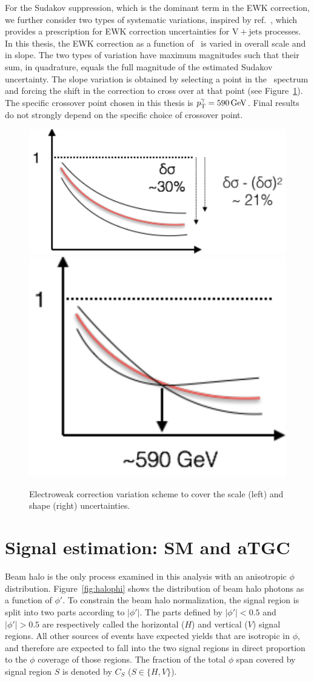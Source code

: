 For the Sudakov suppression, which is the dominant term in the EWK correction, we further
consider two types of systematic variations, inspired by ref.~\cite{ref:epjc/s10052-017-5389-1}, which provides
a prescription for EWK correction uncertainties for $\mathrm{V}+\mathrm{jets}$ processes. In
this thesis, the EWK correction as a function of \pTgamma\ is varied in overall scale and in
slope. The two types of variation have maximum magnitudes such that their sum, in quadrature, equals the full
magnitude of the estimated Sudakov uncertainty. The slope variation is obtained by selecting a point in the \pTgamma\ spectrum and forcing
the shift in the correction to cross over at that point (see Figure~\ref{fig:ewk_correction_cartoon}). The specific crossover
point chosen in this thesis is $\pTgamma = 590\unit{GeV}$. Final results do not strongly depend on the
specific choice of crossover point.

\begin{figure}[htbp]
  \centering
  \includegraphics[height=0.3\linewidth]{Figures/vg/ewk_correction_scale.pdf}
  \includegraphics[height=0.3\linewidth]{Figures/vg/ewk_correction_shape.pdf}
  \caption{
    Electroweak correction variation scheme to cover the scale (left) and shape (right) uncertainties.
  }
  \label{fig:ewk_correction_cartoon}
\end{figure}

\section{Signal estimation: SM and aTGC} \label{sec:signal_extraction_SM_aTGC}
Beam halo is the only process examined in this analysis with an anisotropic $\phi$ distribution.
Figure~\ref{fig:halophi} shows the distribution of beam halo photons as a function of $\phi'$.
To constrain the beam halo normalization, the signal region is split into two parts according to $|\phi'|$.
The parts defined by $|\phi'| < 0.5$ and $|\phi'| > 0.5$ are respectively called the horizontal ($H$) and vertical ($V$) signal
regions. All other sources of events have expected yields that are isotropic in $\phi$, and therefore
are expected to fall into the two signal regions in direct proportion to the $\phi$ coverage of those regions.
The fraction of the total $\phi$ span covered by signal region $S$ is denoted by $C_{S}$ ($S \in \{H,V\}$).

